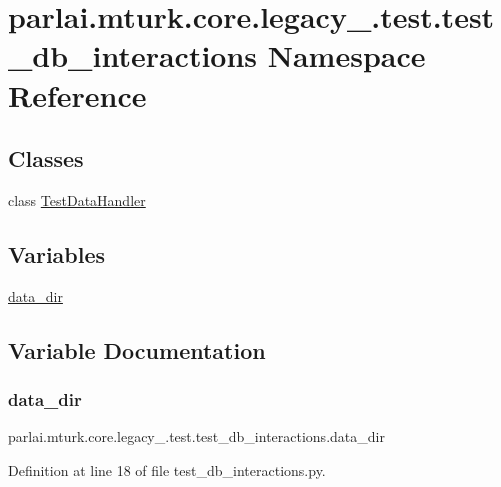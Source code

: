 \hypertarget{namespaceparlai_1_1mturk_1_1core_1_1legacy__2018_1_1test_1_1test__db__interactions}{}\section{parlai.\+mturk.\+core.\+legacy\+\_.\+test.\+test\+\_\+db\+\_\+interactions Namespace Reference}
\label{namespaceparlai_1_1mturk_1_1core_1_1legacy__2018_1_1test_1_1test__db__interactions}
\subsection*{Classes}
\begin{DoxyCompactItemize}
\item 
class \hyperlink{classparlai_1_1mturk_1_1core_1_1legacy__2018_1_1test_1_1test__db__interactions_1_1TestDataHandler}{Test\+Data\+Handler}
\end{DoxyCompactItemize}
\subsection*{Variables}
\begin{DoxyCompactItemize}
\item 
\hyperlink{namespaceparlai_1_1mturk_1_1core_1_1legacy__2018_1_1test_1_1test__db__interactions_ab430e4ea1590be5c12b661c8cdd83f9a}{data\+\_\+dir}
\end{DoxyCompactItemize}


\subsection{Variable Documentation}
\mbox{\label{namespaceparlai_1_1mturk_1_1core_1_1legacy__2018_1_1test_1_1test__db__interactions_ab430e4ea1590be5c12b661c8cdd83f9a}} 
\subsubsection{\texorpdfstring{data\+\_\+dir}{data\_dir}}
{\footnotesize\ttfamily parlai.\+mturk.\+core.\+legacy\+\_.\+test.\+test\+\_\+db\+\_\+interactions.\+data\+\_\+dir}



Definition at line 18 of file test\+\_\+db\+\_\+interactions.\+py.

